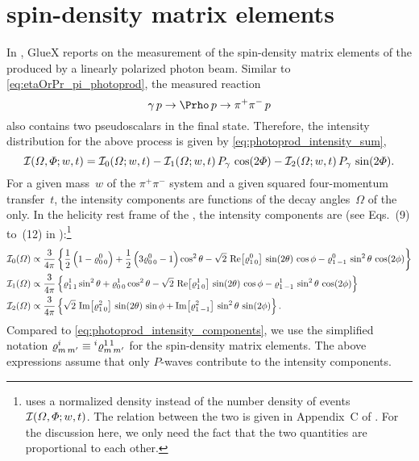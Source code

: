 \section{\Prho spin-density matrix elements}%
\label{sec:rho_sdme}

In , GlueX reports on the measurement of the
spin-density matrix elements of the \Prho produced by a linearly
polarized photon beam.  Similar to \cref{eq:etaOrPr_pi_photoprod}, the
measured reaction
\begin{equation}
  \label{eq:rho_photoprod}
  \gamma\, p \to \Prho\, p \to \pi^+ \pi^-\, p
\end{equation}
also contains two pseudoscalars in the final state.  Therefore, the
intensity distribution for the above process is given by
\cref{eq:photoprod_intensity_sum}, \ie
\begin{equation}
  \label{eq:photoprod_intensity_sum2}
  \mathcal{I}(\Omega, \Phi; w, t)
  = \mathcal{I}_0(\Omega; w, t)
  - \mathcal{I}_1(\Omega; w, t)\, P_\gamma\, \cos(2 \Phi)
  - \mathcal{I}_2(\Omega; w, t)\, P_\gamma\, \sin(2 \Phi).
\end{equation}
For a given mass~$w$ of the $\pi^+ \pi^-$ system and a given squared
four-momentum transfer~$t$, the intensity components are functions of
the decay angles~$\Omega$ of the \Prho only.  In the helicity rest
frame of the \Prho, the intensity components are (see Eqs.~(9) to~(12)
in ):\footnote{ uses a
normalized density instead of the number density of events
$\mathcal{I}(\Omega, \Phi; w, t)$.  The relation between the two is
given in Appendix~C of .  For the discussion
here, we only need the fact that the two quantities are proportional
to each other.}
\begin{align}
  \label{eq:intensity_0_rho_photoprod}
  \intensity_0(\Omega)
  \propto{}& \frac{3}{4 \pi} \cBrk{\frac{1}{2} \rBrk{1 - \varrho^0_{0\, 0}} + \frac{1}{2} \rBrk{3 \varrho^0_{0\, 0} - 1} \cos^2 \theta
  - \sqrt{2}\, \Re[1]{\varrho^0_{1\, 0}}\, \sin(2 \theta)\, \cos \phi - \varrho^0_{1\, {-1}}\, \sin^2 \theta\, \cos(2 \phi)} \\
  \label{eq:intensity_1_rho_photoprod}
  \intensity_1(\Omega)
  \propto{}& \frac{3}{4 \pi} \cBrk{\varrho^1_{1\, 1} \sin^2 \theta + \varrho^1_{0\, 0} \cos^2 \theta
  - \sqrt{2}\, \Re[1]{\varrho^1_{1\, 0}}\, \sin(2 \theta)\, \cos \phi - \varrho^1_{1\, {-1}}\, \sin^2 \theta\, \cos(2 \phi)} \\
  \label{eq:intensity_2_rho_photoprod}
  \intensity_2(\Omega)
  \propto{}& \frac{3}{4 \pi} \cBrk{\sqrt{2}\, \Im[1]{\varrho^2_{1\, 0}}\, \sin(2 \theta)\, \sin \phi
  + \Im[1]{\varrho^2_{1\, {-1}}}\, \sin^2 \theta\, \sin(2 \phi)}.
\end{align}
Compared to \cref{eq:photoprod_intensity_components}, we use the
simplified notation $\varrho^i_{m\, m'} \equiv
\prescript{i}{}{\varrho}^{1\, 1}_{m\, m'}$ for the spin-density matrix
elements.  The above expressions assume that only $P$-waves contribute
to the intensity components.

